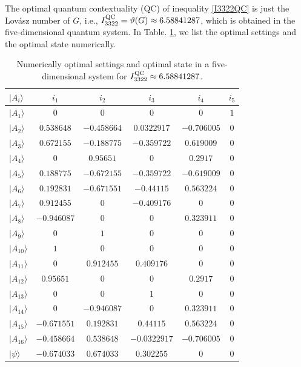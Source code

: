 \documentclass[pra,aps,notitlepage,superscriptaddress,showpacs,showkeys]{revtex4-1}
\theoremstyle{definition}
\theoremstyle{remark}
\begin{document}
The optimal quantum contextuality (QC) of inequality \eqref{I3322QC} is just the Lov\'asz number of $G$, i.e.,  $I_{3322}^{\rm QC}=\vartheta(G)\approx6.58841287$, which is obtained in the
five-dimensional quantum system. In Table. \ref{numerical}, we list
the optimal settings and the optimal state numerically.
\begin{table}[t]
\centering
\caption{Numerically optimal settings and optimal state in a five-dimensional system for $I_{3322}^{\rm QC}\approx6.58841287$.}
  \begin{tabular}{lccccc} \hline \hline
$|A_i\rangle$ & $i_1$ & $i_2$ & $i_3$ & $i_4$ & $i_5$ \\
\hline
$|A_1\rangle$  & $0$ & $0$ & $0$ & $0$ & $1$ \\
$|A_2\rangle$  & $0.538648$ & $-0.458664$ & $0.0322917$ & $-0.706005$ & $0$ \\
$|A_3\rangle$  & $0.672155$ & $-0.188775$ & $-0.359722$ & $0.619009$ & $0$ \\
$|A_4\rangle$  & $0$ & $0.95651$ & $0$ & $0.2917$ & $0$ \\
$|A_5\rangle$  & $0.188775$ & $-0.672155$ & $-0.359722$ & $-0.619009$ & $0$ \\
$|A_6\rangle$  & $0.192831$ & $-0.671551$ & $-0.44115$ & $0.563224$ & $0$ \\
$|A_7\rangle$  & $0.912455$ & $0$ & $-0.409176$ & $0$ & $0$ \\
$|A_8\rangle$  & $-0.946087$ & $0$ & $0$ & $0.323911$ & $0$ \\
$|A_9\rangle$  & $0$ & $1$ & $0$ & $0$ & $0$ \\
$|A_{10}\rangle$ & $1$ & $0$ & $0$ & $0$ & $0$ \\
$|A_{11}\rangle$ & $0$ & $0.912455$ & $0.409176$ & $0$ & $0$ \\
$|A_{12}\rangle$ & $0.95651$ & $0$ & $0$ & $0.2917$ & $0$ \\
$|A_{13}\rangle$ & $0$ & $0$ & $1$ & $0$ & $0$ \\
$|A_{14}\rangle$ & $0$ & $-0.946087$ & $0$ & $0.323911$ & $0$ \\
$|A_{15}\rangle$ & $-0.671551$ & $0.192831$ & $0.44115$ & $0.563224$ & $0$ \\
$|A_{16}\rangle$ & $-0.458664$ & $0.538648$ & $-0.0322917$ & $-0.706005$ & $0$ \\
\hline
$|\psi\rangle$ & $-0.674033$ & $0.674033$ & $0.302255$ & $0$ & $0$\\
  \hline \hline
   \end{tabular}
\label{numerical}
\end{table}
\end{document}
